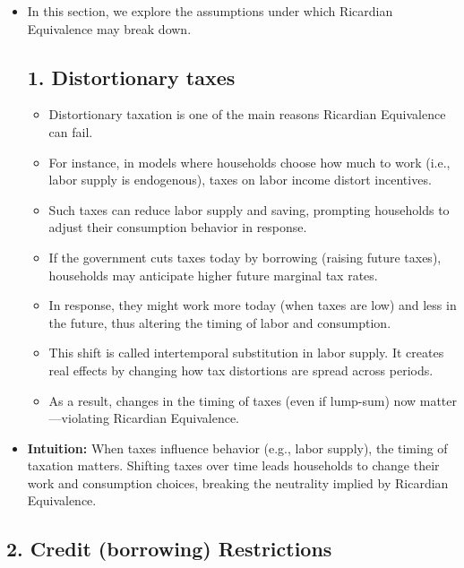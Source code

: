 \documentclass[12pt]{article}
\begin{document}
\begin{itemize}
\item In this section, we explore the assumptions under which Ricardian Equivalence may break down.


\subsection*{\noindent\textbf{1. Distortionary taxes}}
\begin{itemize}
    \item Distortionary taxation is one of the main reasons Ricardian Equivalence can fail.

    \item For instance, in models where households choose how much to work (i.e., labor supply is endogenous), taxes on labor income distort incentives.

    \item Such taxes can reduce labor supply and saving, prompting households to adjust their consumption behavior in response.

    \item If the government cuts taxes today by borrowing (raising future taxes), households may anticipate higher future marginal tax rates.

    \item In response, they might work more today (when taxes are low) and less in the future, thus altering the timing of labor and consumption.

    \item This shift is called intertemporal substitution in labor supply. It creates real effects by changing how tax distortions are spread across periods.

    \item As a result, changes in the timing of taxes (even if lump-sum) now matter—violating Ricardian Equivalence.
\end{itemize}

\item \textbf{Intuition:} When taxes influence behavior (e.g., labor supply), the timing of taxation matters. Shifting taxes over time leads households to change their work and consumption choices, breaking the neutrality implied by Ricardian Equivalence.
\end{itemize}

\subsection*{\noindent\textbf{2. Credit (borrowing) Restrictions}}
\end{document}
